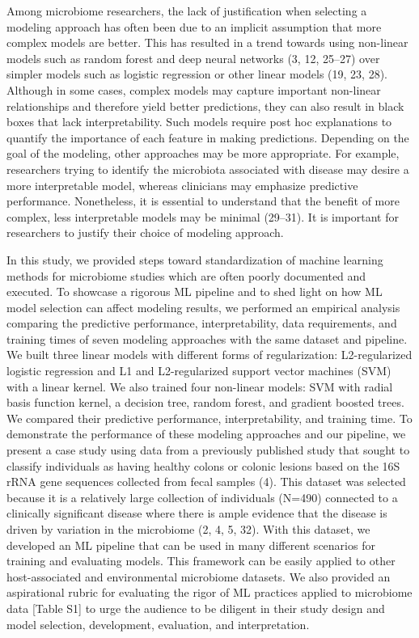 \documentclass[11pt,]{article}
\begin{document}
Among microbiome researchers, the lack of justification when selecting a
modeling approach has often been due to an implicit assumption that more
complex models are better. This has resulted in a trend towards using
non-linear models such as random forest and deep neural networks (3, 12,
25--27) over simpler models such as logistic regression or other linear
models (19, 23, 28). Although in some cases, complex models may capture
important non-linear relationships and therefore yield better
predictions, they can also result in black boxes that lack
interpretability. Such models require post hoc explanations to quantify
the importance of each feature in making predictions. Depending on the
goal of the modeling, other approaches may be more appropriate. For
example, researchers trying to identify the microbiota associated with
disease may desire a more interpretable model, whereas clinicians may
emphasize predictive performance. Nonetheless, it is essential to
understand that the benefit of more complex, less interpretable models
may be minimal (29--31). It is important for researchers to justify
their choice of modeling approach.

In this study, we provided steps toward standardization of machine
learning methods for microbiome studies which are often poorly
documented and executed. To showcase a rigorous ML pipeline and to shed
light on how ML model selection can affect modeling results, we
performed an empirical analysis comparing the predictive performance,
interpretability, data requirements, and training times of seven
modeling approaches with the same dataset and pipeline. We built three
linear models with different forms of regularization: L2-regularized
logistic regression and L1 and L2-regularized support vector machines
(SVM) with a linear kernel. We also trained four non-linear models: SVM
with radial basis function kernel, a decision tree, random forest, and
gradient boosted trees. We compared their predictive performance,
interpretability, and training time. To demonstrate the performance of
these modeling approaches and our pipeline, we present a case study
using data from a previously published study that sought to classify
individuals as having healthy colons or colonic lesions based on the 16S
rRNA gene sequences collected from fecal samples (4). This dataset was
selected because it is a relatively large collection of individuals
(N=490) connected to a clinically significant disease where there is
ample evidence that the disease is driven by variation in the microbiome
(2, 4, 5, 32). With this dataset, we developed an ML pipeline that can
be used in many different scenarios for training and evaluating models.
This framework can be easily applied to other host-associated and
environmental microbiome datasets. We also provided an aspirational
rubric for evaluating the rigor of ML practices applied to microbiome
data {[}Table S1{]} to urge the audience to be diligent in their study
design and model selection, development, evaluation, and interpretation.
\end{document}
